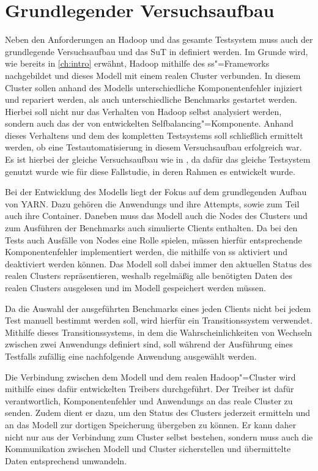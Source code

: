\section{Grundlegender Versuchsaufbau}
\label{sec:clusterSetup}

Neben den Anforderungen an Hadoop und das gesamte Testsystem muss auch der grundlegende Versuchsaufbau und das \gls{SuT} in definiert werden.
Im Grunde wird, wie bereits in \cref{ch:intro} erwähnt, Hadoop mithilfe des \gls{ss}"=Frameworks nachgebildet und dieses Modell mit einem realen Cluster verbunden.
In diesem Cluster sollen anhand des Modells unterschiedliche Komponentenfehler injiziert und repariert werden, als auch unterschiedliche Benchmarks gestartet werden.
Hierbei soll nicht nur das Verhalten von Hadoop selbst analysiert werden, sondern auch das der von \citeauthor{Zhang2016} entwickelten Selfbalancing"=Komponente.
Anhand dieses Verhaltens und dem des kompletten Testsystems soll schließlich ermittelt werden, ob eine Testautomatisierung in diesem Versuchsaufbau erfolgreich war.
Es ist hierbei der gleiche Versuchsaufbau wie in \cite{Eberhardinger2018}, da dafür das gleiche Testsystem genutzt wurde wie für diese Fallstudie, in deren Rahmen es entwickelt wurde.

Bei der Entwicklung des Modells liegt der Fokus auf dem grundlegenden Aufbau von \gls{YARN}.
Dazu gehören die \glspl{Anwendung} und ihre Attempts, sowie zum Teil auch ihre Container.
Daneben muss das Modell auch die Nodes des Clusters und zum Ausführen der Benchmarks auch simulierte Clients enthalten.
Da bei den \glspl{Test} auch Ausfälle von Nodes eine Rolle spielen, müssen hierfür entsprechende Komponentenfehler implementiert werden, die mithilfe von \gls{ss} aktiviert und deaktiviert werden können.
Das Modell soll dabei immer den aktuellen Status des realen Clusters repräsentieren, weshalb regelmäßig alle benötigten Daten des realen Clusters ausgelesen und im Modell gespeichert werden müssen.

Da die Auswahl der ausgeführten Benchmarks eines jeden Clients nicht bei jedem \gls{Test} manuell bestimmt werden soll, wird hierfür ein Transitionssystem verwendet.
Mithilfe dieses Transitionssystems, in dem die Wahrscheinlichkeiten von Wechseln zwischen zwei \glspl{Anwendung} definiert sind, soll während der Ausführung eines Testfalls zufällig eine nachfolgende \gls{Anwendung} ausgewählt werden.

Die Verbindung zwischen dem Modell und dem realen Hadoop"=Cluster wird mithilfe eines dafür entwickelten Treibers durchgeführt.
Der Treiber ist dafür verantwortlich, Komponentenfehler und \glspl{Anwendung} an das reale Cluster zu senden.
Zudem dient er dazu, um den Status des Clusters jederzeit ermitteln und an das Modell zur dortigen Speicherung übergeben zu können.
Er kann daher nicht nur aus der Verbindung zum Cluster selbst bestehen, sondern muss auch die Kommunikation zwischen Modell und Cluster sicherstellen und übermittelte Daten entsprechend umwandeln.

